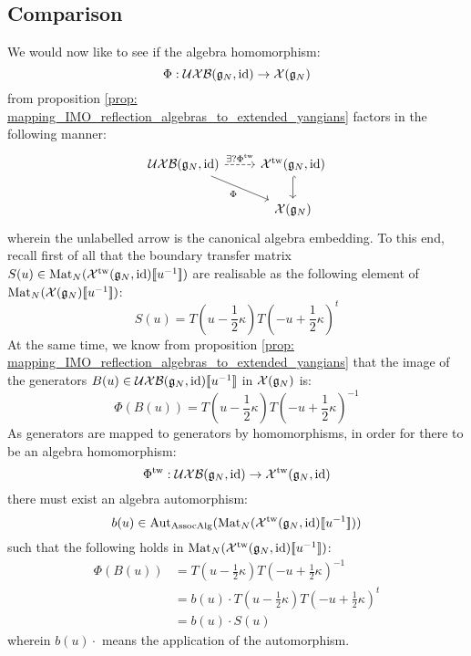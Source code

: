         \subsection{Comparison}
            We would now like to see if the algebra homomorphism:
                $$\Phi: \mathcal{UXB}(\mathfrak{g}_N, \mathrm{id}) \to \mathcal{X}(\mathfrak{g}_N)$$
            from proposition \ref{prop: mapping_IMO_reflection_algebras_to_extended_yangians} factors in the following manner:
                \begin{equation} \label{equation: mapping_IMO_reflection_algebras_to_extended_untwisted_yangians_via_extended_twisted_yangians}
                    \begin{tikzcd}
                	{\UXB(\g_N, \id)} & {\calX^{\tw}(\g_N, \id)} \\
                	& {\calX(\g_N)}
                	\arrow["{\exists ? \Phi^{\tw}}", dashed, from=1-1, to=1-2]
                	\arrow["\Phi"', from=1-1, to=2-2]
                	\arrow[hook, from=1-2, to=2-2]
                    \end{tikzcd}
                \end{equation}
            wherein the unlabelled arrow is the canonical algebra embedding. To this end, recall first of all that the boundary transfer matrix $S(u) \in \mathrm{Mat}_N(\mathcal{X}^{\mathrm{tw}}(\mathfrak{g}_N, \mathrm{id})[\![u^{-1}]\!])$ are realisable as the following element of $\mathrm{Mat}_N(\mathcal{X}(\mathfrak{g}_N)[\![u^{-1}]\!])$:
                $$S(u) = T\left(u - \frac12 \kappa\right) T\left(-u + \frac12 \kappa\right)^t$$
            At the same time, we know from proposition \ref{prop: mapping_IMO_reflection_algebras_to_extended_yangians} that the image of the generators $B(u) \in \mathcal{UXB}(\mathfrak{g}_N, \mathrm{id})[\![u^{-1}]\!]$ in $\mathcal{X}(\mathfrak{g}_N)$ is:
                $$\Phi( B(u) ) = T\left(u - \frac12 \kappa\right) T\left(-u + \frac12 \kappa\right)^{-1}$$
            As generators are mapped to generators by homomorphisms, in order for there to be an algebra homomorphism:
                $$\Phi^{\mathrm{tw}}: \mathcal{UXB}(\mathfrak{g}_N, \mathrm{id}) \to \mathcal{X}^{\mathrm{tw}}(\mathfrak{g}_N, \mathrm{id})$$
            there must exist an algebra automorphism:
                $$b(u) \in \mathrm{Aut}_{\mathrm{Assoc}\mathrm{Alg}}( \mathrm{Mat}_N(\mathcal{X}^{\mathrm{tw}}(\mathfrak{g}_N, \mathrm{id})[\![u^{-1}]\!]) )$$
            such that the following holds in $\mathrm{Mat}_N(\mathcal{X}^{\mathrm{tw}}(\mathfrak{g}_N, \mathrm{id})[\![u^{-1}]\!])$:
                $$
                    \begin{aligned}
                        \Phi(B(u)) & = T\left(u - \frac12 \kappa\right) T\left(-u + \frac12 \kappa\right)^{-1}
                        \\
                        & = b(u) \cdot T\left(u - \frac12 \kappa\right) T\left(-u + \frac12 \kappa\right)^t
                        \\
                        & = b(u) \cdot S(u)
                    \end{aligned}
                $$
            wherein $b(u) \cdot$ means the application of the automorphism.
            
